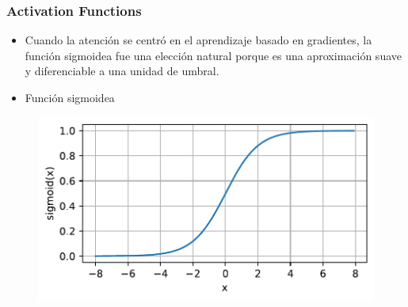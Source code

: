 \documentclass[
  shownotes,
  xcolor={svgnames},
  hyperref={colorlinks,citecolor=DarkBlue,linkcolor=DarkRed,urlcolor=DarkBlue}
  , aspectratio=169]{beamer}
\begin{document}
\begin{frame}
\frametitle{Activation Functions}





\begin{itemize}


\item Cuando la atención se centró en el aprendizaje basado en gradientes, la función sigmoidea fue una elección natural porque es una aproximación suave y diferenciable a una unidad de umbral.
\medskip
\item Función sigmoidea



\end{itemize}

  \begin{figure}[H] \centering
            \captionsetup{justification=centering}
              \includegraphics[scale=0.45]{figures/sigmoid}
              
 \end{figure}

\end{frame}
\end{document}
